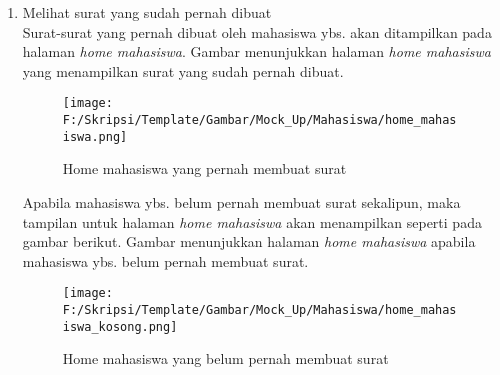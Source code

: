 \begin{enumerate}
	\item Melihat surat yang sudah pernah dibuat\\
	Surat-surat yang pernah dibuat oleh mahasiswa ybs. akan ditampilkan pada halaman \textit{home mahasiswa}. Gambar menunjukkan halaman \textit{home mahasiswa} yang menampilkan surat yang sudah pernah dibuat.

	\begin{figure}[H]
	\centering
		\texttt{[image: F:/Skripsi/Template/Gambar/Mock\_Up/Mahasiswa/home\_mahasiswa.png]}
		\caption{Home mahasiswa yang pernah membuat surat}
		\label{fig:home_mahasiswa_yang_pernah_membuat_surat}
	\end{figure}
	
	Apabila mahasiswa ybs. belum pernah membuat surat sekalipun, maka tampilan untuk halaman \textit{home mahasiswa} akan menampilkan seperti pada gambar berikut. Gambar menunjukkan halaman \textit{home mahasiswa} apabila mahasiswa ybs. belum pernah membuat surat.
	\begin{figure}[H]
	\centering
		\texttt{[image: F:/Skripsi/Template/Gambar/Mock\_Up/Mahasiswa/home\_mahasiswa\_kosong.png]}
		\caption{Home mahasiswa yang belum pernah membuat surat}
		\label{fig:home_mahasiswa_yang_belum_pernah_membuat_surat}
	\end{figure}
\end{enumerate}

